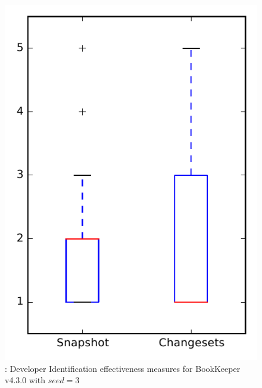 
\begin{figure}
\centering
\includegraphics[height=0.4\textheight]{figures/dit_seed/rq1_bookkeeper_3}
\caption{\rtwo: Developer Identification effectiveness measures for BookKeeper v4.3.0 with $seed=3$}
\label{fig:dit_seed:rq1:bookkeeper}
\end{figure}

